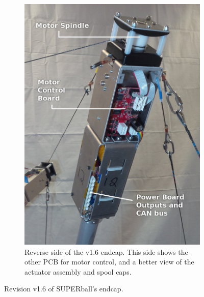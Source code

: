 \documentclass[12pt]{report}
\begin{document}
\begin{figure}
  \begin{subfigure}[b]{0.4\textwidth}
    \includegraphics[width=1\textwidth]{img/endcap_upclose_motorboard_labelled.jpg}
    \caption{Reverse side of the v1.6 endcap. This side shows the other PCB for motor control, and a better view of the actuator assembly and spool caps.}
    \label{fig:final_endcap_reverse}
  \end{subfigure}
  \caption{Revision v1.6 of SUPERball's endcap.}
  \label{fig:final_endcap}
\end{figure}
\end{document}
